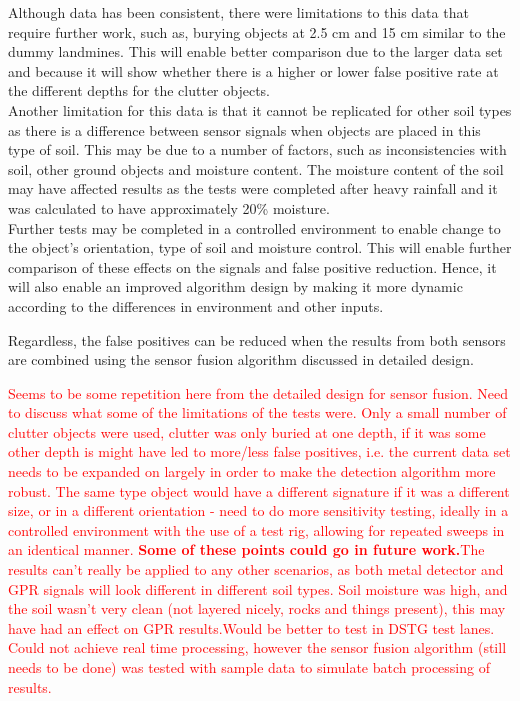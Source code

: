 \documentclass[main.tex]{subfiles}
\begin{document}
Although data has been consistent, there were limitations to this data that require further work, such as, burying objects at 2.5 cm and 15 cm similar to the dummy landmines. This will enable better comparison due to the larger data set and because it will show whether there is a higher or lower false positive rate at the different depths for the clutter objects. \\
Another limitation for this data is that it cannot be replicated for other soil types as there is a difference between sensor signals when objects are placed in this type of soil. This may be due to a number of factors, such as inconsistencies with soil, other ground objects and moisture content. The moisture content of the soil may have affected results as the tests were completed after heavy rainfall and it was calculated to have approximately 20\% moisture. \\
Further tests may be completed in a controlled environment to enable change to the object's orientation, type of soil and moisture control. This will enable further comparison of these effects on the signals and false positive reduction. Hence, it will also enable an improved algorithm design by making it more dynamic according to the differences in environment and other inputs. 

Regardless, the false positives can be reduced when the results from both sensors are combined using the sensor fusion algorithm discussed in detailed design.


\textcolor{red}{Seems to be some repetition here from the detailed design for sensor fusion. Need to discuss what some of the limitations of the tests were. Only a small number of clutter objects were used, clutter was only buried at one depth, if it was some other depth is might have led to more/less false positives, i.e. the current data set needs to be expanded on largely in order to make the detection algorithm more robust. The same type object would have a different signature if it was a different size, or in a different orientation - need to do more sensitivity testing, ideally in a controlled environment with the use of a test rig, allowing for repeated sweeps in an identical manner. \textbf{Some of these points could go in future work.}The results can't really be applied to any other scenarios, as both metal detector and GPR signals will look different in different soil types. Soil moisture was high, and the soil wasn't very clean (not layered nicely, rocks and things present), this may have had an effect on GPR results.Would be better to test in DSTG test lanes. Could not achieve real time processing, however the sensor fusion algorithm (still needs to be done) was tested with sample data to simulate batch processing of results.}
\end{document}
